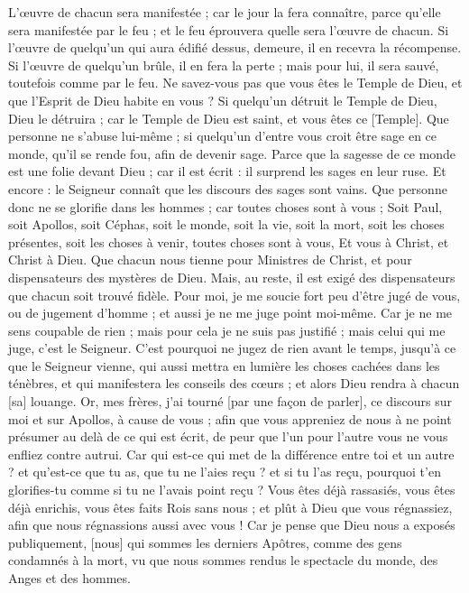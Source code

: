 \begin{multicols}{2}
L'œuvre de chacun sera manifestée ; car le jour la fera connaître, parce qu'elle sera manifestée par le feu ; et le feu éprouvera quelle sera l'œuvre de chacun.
Si l'œuvre de quelqu'un qui aura édifié dessus, demeure, il en recevra la récompense.
Si l'œuvre de quelqu'un brûle, il en fera la perte ; mais pour lui, il sera sauvé, toutefois comme par le feu.
Ne savez-vous pas que vous êtes le Temple de Dieu, et que l’Esprit de Dieu habite en vous ?
Si quelqu'un détruit le Temple de Dieu, Dieu le détruira ; car le Temple de Dieu est saint, et vous êtes ce [Temple].
Que personne ne s'abuse lui-même ; si quelqu'un d'entre vous croit être sage en ce monde, qu'il se rende fou, afin de devenir sage.
Parce que la sagesse de ce monde est une folie devant Dieu ; car il est écrit : il surprend les sages en leur ruse.
Et encore : le Seigneur connaît que les discours des sages sont vains.
Que personne donc ne se glorifie dans les hommes ; car toutes choses sont à vous ;
Soit Paul, soit Apollos, soit Céphas, soit le monde, soit la vie, soit la mort, soit les choses présentes, soit les choses à venir, toutes choses sont à vous,
Et vous à Christ, et Christ à Dieu.
\VerseOne{}Que chacun nous tienne pour Ministres de Christ, et pour dispensateurs des mystères de Dieu.
Mais, au reste, il est exigé des dispensateurs que chacun soit trouvé fidèle.
Pour moi, je me soucie fort peu d'être jugé de vous, ou de jugement d'homme ; et aussi je ne me juge point moi-même.
Car je ne me sens coupable de rien ; mais pour cela je ne suis pas justifié ; mais celui qui me juge, c'est le Seigneur.
C'est pourquoi ne jugez de rien avant le temps, jusqu'à ce que le Seigneur vienne, qui aussi mettra en lumière les choses cachées dans les ténèbres, et qui manifestera les conseils des cœurs ; et alors Dieu rendra à chacun [sa] louange.
Or, mes frères, j'ai tourné [par une façon de parler], ce discours sur moi et sur Apollos, à cause de vous ; afin que vous appreniez de nous à ne point présumer au delà de ce qui est écrit, de peur que l'un pour l'autre vous ne vous enfliez contre autrui.
Car qui est-ce qui met de la différence entre toi et un autre ? et qu'est-ce que tu as, que tu ne l'aies reçu ? et si tu l'as reçu, pourquoi t'en glorifies-tu comme si tu ne l'avais point reçu ?
Vous êtes déjà rassasiés, vous êtes déjà enrichis, vous êtes faits Rois sans nous ; et plût à Dieu que vous régnassiez, afin que nous régnassions aussi avec vous !
Car je pense que Dieu nous a exposés publiquement, [nous] qui sommes les derniers Apôtres, comme des gens condamnés à la mort, vu que nous sommes rendus le spectacle du monde, des Anges et des hommes.

\end{multicols}
